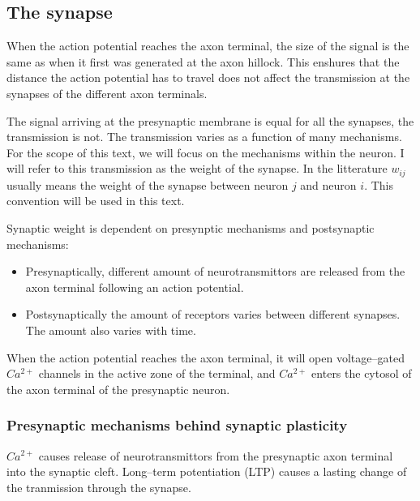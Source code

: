 \subsection{The synapse}
\label{ssecTheSynapse}
When the action potential reaches the axon terminal, the size of the signal is the same as when it first was generated at the axon hillock.
This enshures that the distance the action potential has to travel does not affect the transmission at the synapses of the different axon terminals. \cite{?}

The signal arriving at the presynaptic membrane is equal for all the synapses, the transmission is not. The transmission varies as a function of many mechanisms.
For the scope of this text, we will focus on the mechanisms within the neuron. I will refer to this transmission as the weight of the synapse. 
In the litterature $w_{ij}$ usually means the weight of the synapse between neuron $j$ and neuron $i$. This convention will be used in this text. 

Synaptic weight is dependent on presynptic mechanisms and postsynaptic mechanisms:

\begin{itemize}
	\item Presynaptically, different amount of neurotransmittors are released from the axon terminal following an action potential.
	\item Postsynaptically the amount of receptors varies between different synapses. The amount also varies with time.%
\end{itemize}

When the action potential reaches the axon terminal, it will open voltage--gated $Ca^{2+}$ channels in the active zone of the terminal, and $Ca^{2+}$ enters the cytosol of the axon terminal of the presynaptic neuron\cite{PrinciplesOfNeuralScience4edKAP10}.


\subsubsection{Presynaptic mechanisms behind synaptic plasticity}
$Ca^{2+}$ causes release of neurotransmittors from the presynaptic axon terminal into the synaptic cleft\cite{PrinciplesOfNeuralScience4edKAP10}. 
Long--term potentiation (LTP) causes a lasting change of the tranmission through the synapse.%

